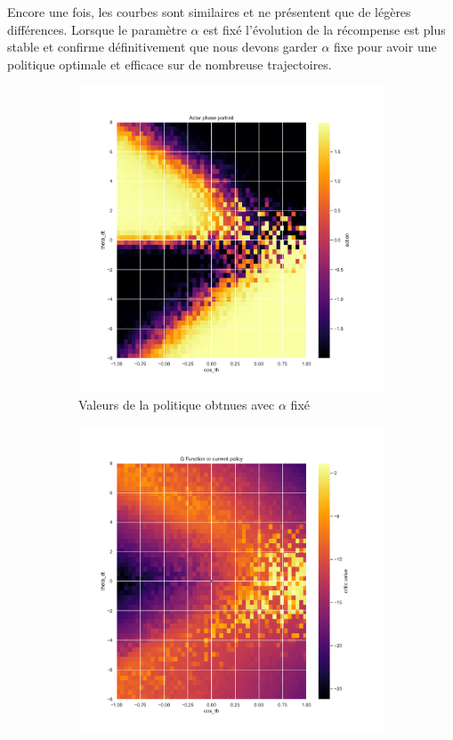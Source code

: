 Encore une fois, les courbes sont similaires et ne présentent que de légères différences. Lorsque le paramètre \(\alpha\) est fixé l'évolution de la récompense est plus stable et confirme définitivement que nous devons garder \(\alpha\) fixe pour avoir une politique optimale et efficace sur de nombreuse trajectoires.

\begin{figure}[H]
    \centering
    \begin{subfigure}{0.45\textwidth}
        \includegraphics[width=\textwidth]{figures/sac_itr4/a_fixed/5_actor_pg__post_Pendulum-v0.pdf}
        \caption{Valeurs de la politique obtnues avec \(\alpha\) fixé}
    \end{subfigure}
    \begin{subfigure}{0.45\textwidth}
        \includegraphics[width=\textwidth]{figures/sac_itr4/a_fixed/5_critic_pg_q2_post_Pendulum-v0.pdf}

\end{subfigure}
\end{figure}
